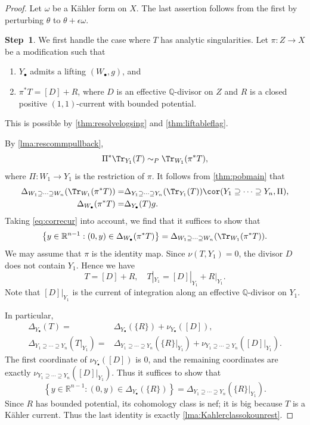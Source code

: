 \begin{proof}
    Let $\omega$ be a K\"ahler form on $X$. The last assertion follows from the first by perturbing $\theta$ to $\theta+\epsilon\omega$.

    \textbf{Step~1}.
    We first handle the case where $T$ has analytic singularities. Let $\pi\colon Z\rightarrow X$ be a modification such that
    \begin{enumerate}
        \item\label{itm:chapter-Okounkov:L1728:1} $Y_{\bullet}$ admits a lifting $(W_{\bullet},g)$, and
        \item\label{itm:chapter-Okounkov:L1728:2} $\pi^*T=[D]+R$, where $D$ is an effective $\mathbb{Q}$-divisor on $Z$ and $R$ is a closed positive $(1,1)$-current with bounded potential.
    \end{enumerate}
    This is possible by \cref{thm:resolvelogsing} and \cref{thm:liftableflag}.

    By \cref{lma:rescommpullback},
    \[
    \Pi^*\Tr_{Y_1}(T)\sim_P \Tr_{W_1}(\pi^*T),
    \]
    where $\Pi\colon W_1\rightarrow Y_1$ is the restriction of $\pi$. It follows from \cref{thm:pobmain} that
    \[
    \begin{split}
    \Delta_{W_1\supseteq \cdots \supseteq W_n}(\Tr_{W_1}(\pi^*T))=& \Delta_{Y_1\supseteq \cdots \supseteq Y_n}(\Tr_{Y_1}(T))\cor(Y_1\supseteq \cdots \supseteq Y_n,\Pi),\\
    \Delta_{W_{\bullet}}(\pi^*T)=&\Delta_{Y_{\bullet}}(T)g.
    \end{split}
    \]
    Taking \eqref{eq:correcur} into account, we find that it suffices to show that
    \[
    \left\{y\in \mathbb{R}^{n-1}:(0,y)\in\Delta_{W_{\bullet}}(\pi^*T) \right\}=\Delta_{W_1\supseteq \cdots \supseteq W_n}(\Tr_{W_1}(\pi^*T)).
    \]
    We may assume that $\pi$ is the identity map. Since $\nu(T,Y_1)=0$, the divisor $D$ does not contain $Y_1$. Hence we have
    \[
    T=[D]+R,\quad T|_{Y_1}=[D]|_{Y_1}+R|_{Y_1}.
    \]
    Note that $[D]|_{Y_1}$ is the current of integration along an effective $\mathbb{Q}$-divisor on $Y_1$.

    In particular,
    \[
    \begin{split}
    \Delta_{Y_{\bullet}}(T)=& \Delta_{Y_{\bullet}}(\{R\})+\nu_{Y_{\bullet}}([D]),\\
    \Delta_{Y_1\supseteq \cdots \supseteq Y_n}(T|_{Y_1})=& \Delta_{Y_1\supseteq \cdots \supseteq Y_n}(\{R\}|_{Y_1})+\nu_{Y_1\supseteq \cdots \supseteq Y_n}([D]|_{Y_1}).
    \end{split}
    \]
    The first coordinate of $\nu_{Y_{\bullet}}([D])$ is $0$, and the remaining coordinates are exactly $\nu_{Y_1\supseteq \cdots \supseteq Y_n}([D]|_{Y_1})$. Thus it suffices to show that
    \[
    \left\{y\in \mathbb{R}^{n-1}: (0,y)\in \Delta_{Y_{\bullet}}(\{R\})\right\}=\Delta_{Y_1\supseteq \cdots \supseteq Y_n}(\{R\}|_{Y_1}).
    \]
    Since $R$ has bounded potential, its cohomology class is nef; it is big because $T$ is a Kähler current. Thus the last identity is exactly \cref{lma:Kahlerclassokounrest}.


\end{proof}

